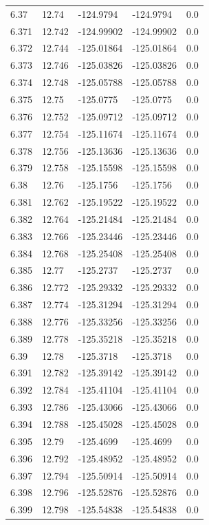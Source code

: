 \begin{tabular}{lllll}
6.37 & 12.74 & -124.9794 & -124.9794 & 0.0 \\
6.371 & 12.742 & -124.99902 & -124.99902 & 0.0 \\
6.372 & 12.744 & -125.01864 & -125.01864 & 0.0 \\
6.373 & 12.746 & -125.03826 & -125.03826 & 0.0 \\
6.374 & 12.748 & -125.05788 & -125.05788 & 0.0 \\
6.375 & 12.75 & -125.0775 & -125.0775 & 0.0 \\
6.376 & 12.752 & -125.09712 & -125.09712 & 0.0 \\
6.377 & 12.754 & -125.11674 & -125.11674 & 0.0 \\
6.378 & 12.756 & -125.13636 & -125.13636 & 0.0 \\
6.379 & 12.758 & -125.15598 & -125.15598 & 0.0 \\
6.38 & 12.76 & -125.1756 & -125.1756 & 0.0 \\
6.381 & 12.762 & -125.19522 & -125.19522 & 0.0 \\
6.382 & 12.764 & -125.21484 & -125.21484 & 0.0 \\
6.383 & 12.766 & -125.23446 & -125.23446 & 0.0 \\
6.384 & 12.768 & -125.25408 & -125.25408 & 0.0 \\
6.385 & 12.77 & -125.2737 & -125.2737 & 0.0 \\
6.386 & 12.772 & -125.29332 & -125.29332 & 0.0 \\
6.387 & 12.774 & -125.31294 & -125.31294 & 0.0 \\
6.388 & 12.776 & -125.33256 & -125.33256 & 0.0 \\
6.389 & 12.778 & -125.35218 & -125.35218 & 0.0 \\
6.39 & 12.78 & -125.3718 & -125.3718 & 0.0 \\
6.391 & 12.782 & -125.39142 & -125.39142 & 0.0 \\
6.392 & 12.784 & -125.41104 & -125.41104 & 0.0 \\
6.393 & 12.786 & -125.43066 & -125.43066 & 0.0 \\
6.394 & 12.788 & -125.45028 & -125.45028 & 0.0 \\
6.395 & 12.79 & -125.4699 & -125.4699 & 0.0 \\
6.396 & 12.792 & -125.48952 & -125.48952 & 0.0 \\
6.397 & 12.794 & -125.50914 & -125.50914 & 0.0 \\
6.398 & 12.796 & -125.52876 & -125.52876 & 0.0 \\
6.399 & 12.798 & -125.54838 & -125.54838 & 0.0 \\

\end{tabular}
